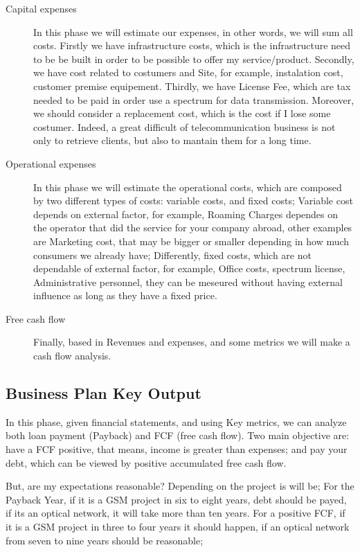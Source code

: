 \documentclass[a4paper,11pt]{article}
\begin{document}
\begin{description}
\item[Capital expenses]  In this phase we  will estimate our  expenses, in other
  words, we  will sum all  costs. Firstly we  have {\color{purple}infrastructure
    costs},  which is the  infrastructure need  to be  be built  in order  to be
  possible  to offer  my  service/product.  Secondly, we  have  cost related  to
  costumers  and   Site,  for   example,  instalation  cost,   customer  premise
  equipement. Thirdly, we  have License Fee, which are tax needed  to be paid in
  order use  a spectrum  for data transmission.  Moreover, we should  consider a
  replacement cost, which  is the cost if I lose some  costumer. Indeed, a great
  difficult of telecommunication  business is not only to  retrieve clients, but
  also to mantain them for a long time.
\item[Operational  expenses] In  this  phase we  will  estimate the  operational
  costs, which are composed by two different types of costs: variable costs, and
  fixed costs;
  Variable  cost  depends  on  external  factor, for  example,  Roaming  Charges
  dependes on the  operator that did the service for  your company abroad, other
  examples are  Marketing cost, that may  be bigger or smaller  depending in how
  much consumers we already have;
  Differently, fixed costs, which are not dependable of external factor, for example, Office costs, spectrum license,
  Administrative  personnel,  they  can  be  meseured  without  having  external
  influence as long as they have a fixed price.


\item[Free cash flow] Finally, based  in Revenues and expenses, and some metrics
  we will make a cash flow analysis.
\end{description}

\subsection{Business Plan Key Output}

In this phase, given financial statements, and using Key metrics, we can analyze
both loan payment (Payback)  and FCF (free cash flow).
Two main objective are: have a  FCF positive, that means, income is greater  than expenses; and pay your debt, which can be viewed by positive accumulated free cash flow.


But, are my expectations reasonable? Depending on the project is will be;
For the  Payback Year, if it  is a GSM project  in six to eight  years, debt
should be payed, if its an optical network, it will take more than ten years.
For a  positive FCF, if  it is a  GSM project in three  to four years  it should
happen, if an optical network from seven to nine years should be reasonable;
\end{document}
